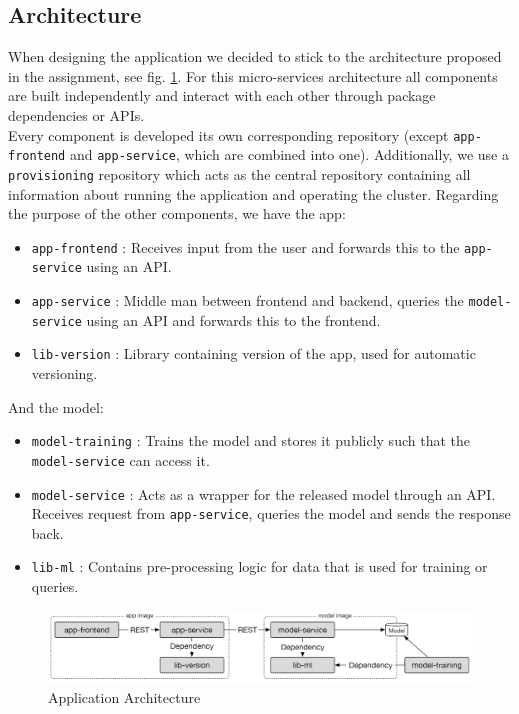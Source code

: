 \subsection{Architecture}
When designing the application we decided to stick to the architecture proposed in the assignment, see fig. {\color{red}\ref{fig:architecture}}.
For this micro-services architecture all components are built independently and interact with each other through package dependencies or APIs. \\
Every component is developed its own corresponding repository (except \texttt{app-frontend} and \texttt{app-service}, which are combined into one). Additionally, we use a \texttt{provisioning} repository which acts as the central repository containing all information about running the application and operating the cluster.
Regarding the purpose of the other components, we have the app:
\begin{itemize}
    \item \texttt{app-frontend} : Receives input from the user and forwards this to the \texttt{app-service} using an API.
    \item \texttt{app-service} : Middle man between frontend and backend, queries the \texttt{model-service} using an API and forwards this to the frontend.
    \item \texttt{lib-version} : Library containing version of the app, used for automatic versioning.
\end{itemize}

And the model:
\begin{itemize}
    \item \texttt{model-training} : Trains the model and stores it publicly such that the \texttt{model-service} can access it.
    \item \texttt{model-service} : Acts as a wrapper for the released model through an API. Receives request from \texttt{app-service}, queries the model and sends the response back.
    \item \texttt{lib-ml} : Contains pre-processing logic for data that is used for training or queries.
\end{itemize}

\begin{figure}
    \centering
    \includegraphics[width=1\linewidth]{images/architecture.png}
    \caption{Application Architecture}
    \label{fig:architecture}
\end{figure}

